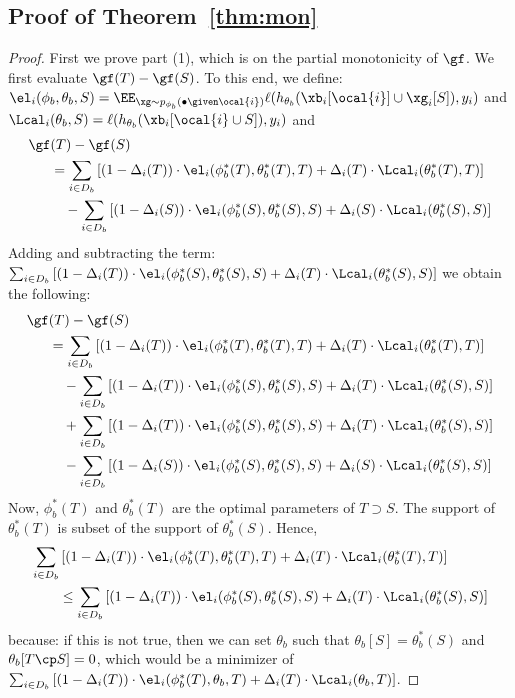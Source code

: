 \subsection{Proof of Theorem~\ref{thm:mon}}
\begin{proof}
First we prove part (1), which is on the partial monotonicity of
$\gf$. We first evaluate $\gf(T) - \gf(S)$. To this end, we define: 
$\el_i(\phi_b , \theta _b , S)  =  \EE_{\xg \sim p_{\phi_b} (\bullet \given     \ocal{i})} \ell(h_{\theta_b }(\xb_i[\ocal{i}] \cup \xg_i[S]) ,y_i) $ and 
$\Lcal_i(\theta _b , S )  =   \ell(h_{\theta_b }(\xb_i[\ocal{i} \cup S]),y_i ) $ and 
\begin{align}
    \gf & (T) - \gf(S) \nonumber\\
    & = \sum_{i\in D_b}\left[(1-\Delta_i(T)) \cdot \el_i(\phi_b ^*(T) , \theta_b ^*(T), T) + \Delta_i(T) \cdot \Lcal_i (\theta _b ^*(T), T) \right]\nonumber \\
 &   \quad - \sum_{i\in D_b} \left[(1-\Delta_i(S)) \cdot \el_i(\phi_b ^*(S) , \theta_b ^*(S), S) + \Delta_i(S) \cdot \Lcal_i (\theta _b ^*(S), S) \right]  
 \end{align}
Adding and subtracting the term: $\sum_{i\in D_b}\left[(1-\Delta_i(T)) \cdot \el_i(\phi_b ^*(S) , \theta_b ^*(S), S) + \Delta_i(T) \cdot \Lcal_i (\theta _b ^*(S), S) \right]$
we obtain the following:
 \begin{align}
 \gf & (T) - \gf(S) \nonumber\\
& = \sum_{i\in D_b}\left[(1-\Delta_i(T)) \cdot \el_i(\phi_b ^*(T) , \theta_b ^*(T), T) + \Delta_i(T) \cdot \Lcal_i (\theta _b ^*(T), T) \right]\nonumber \\
&\quad - \sum_{i\in D_b}\left[(1-\Delta_i(T)) \cdot \el_i(\phi_b ^*(S) , \theta_b ^*(S), S) + \Delta_i(T) \cdot \Lcal_i (\theta _b ^*(S), S) \right]\nonumber \\
&\quad + \sum_{i\in D_b}\left[(1-\Delta_i(T)) \cdot \el_i(\phi_b ^*(S) , \theta_b ^*(S), S) + \Delta_i(T) \cdot \Lcal_i (\theta _b ^*(S), S) \right]\nonumber \\
 &   \quad - \sum_{i\in D_b} \left[(1-\Delta_i(S)) \cdot \el_i(\phi_b ^*(S) , \theta_b ^*(S), S) + \Delta_i(S) \cdot \Lcal_i (\theta _b ^*(S), S) \right] \label{eq:gf0}
\end{align}
Now, $\phi_b ^* (T)$ and $\theta_b ^*(T)$ are the optimal parameters of $T \supset S$. The support of $\theta_b ^*(T)$
is subset of the support of $\theta_b ^* (S)$. 
Hence, 
\begin{align}
&    \sum_{i\in D_b}\left[(1-\Delta_i(T)) \cdot \el_i(\phi_b ^*(T) , \theta_b ^*(T), T) + \Delta_i(T) \cdot \Lcal_i (\theta _b ^*(T), T) \right] \nonumber\\
&\qquad  \le  \sum_{i\in D_b} \left[(1-\Delta_i(T)) \cdot \el_i(\phi_b ^*(S) , \theta_b ^*(S), S) + \Delta_i(T) \cdot \Lcal_i (\theta _b ^*(S), S) \right]
\end{align}
because: if this is not true, then we can set $\theta_b$ such that $\theta_b [S] = \theta_b ^*(S)$ and $\theta_b [T\cp S] = 0$, which would be a minimizer of $  \sum_{i\in D_b}\left[(1-\Delta_i(T)) \cdot \el_i(\phi_b ^*(T) , \theta_b, T) + \Delta_i(T) \cdot \Lcal_i (\theta _b, T) \right]$.


\end{proof}
